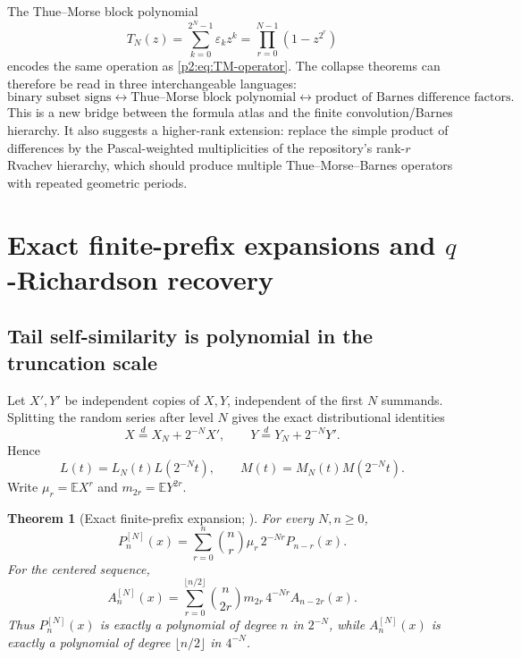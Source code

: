 \documentclass[11pt,oneside]{article}
\numberwithin{equation}{section}
\newtheorem{theorem}{Theorem}[section]
\theoremstyle{definition}
\theoremstyle{remark}
\newcommand{\eps}{\varepsilon}
\begin{document}
The Thue--Morse block polynomial
\begin{equation}
 T_N(z)=\sum_{k=0}^{2^N-1}\eps_kz^k
 =\prod_{r=0}^{N-1}(1-z^{2^r})
 \label{p2:eq:TN}
\end{equation}
encodes the same operation as \eqref{p2:eq:TM-operator}.  The collapse theorems can therefore be read
in three interchangeable languages:
\begin{equation}
 \text{binary subset signs}
 \longleftrightarrow
 \text{Thue--Morse block polynomial}
 \longleftrightarrow
 \text{product of Barnes difference factors}.
 \label{p2:eq:three-languages}
\end{equation}
This is a new bridge between the formula atlas and the finite convolution/Barnes hierarchy.  It also
suggests a higher-rank extension: replace the simple product of differences by the Pascal-weighted
multiplicities of the repository's rank-$r$ Rvachev hierarchy, which should produce multiple
Thue--Morse--Barnes operators with repeated geometric periods.

\section{Exact finite-prefix expansions and \texorpdfstring{$q$}{q}-Richardson recovery}
\label{p2:sec:richardson}

\subsection{Tail self-similarity is polynomial in the truncation scale}

Let $X',Y'$ be independent copies of $X,Y$, independent of the first $N$ summands.  Splitting the
random series after level $N$ gives the exact distributional identities
\begin{equation}
 X\overset{d}=X_N+2^{-N}X',
 \qquad
 Y\overset{d}=Y_N+2^{-N}Y'.
 \label{p2:eq:tail-self-similarity}
\end{equation}
Hence
\begin{equation}
 L(t)=L_N(t)L(2^{-N}t),
 \qquad
 M(t)=M_N(t)M(2^{-N}t).
 \label{p2:eq:finite-infinite-mgf}
\end{equation}
Write $\mu_r=\mathbb EX^r$ and $m_{2r}=\mathbb EY^{2r}$.

\begin{theorem}[Exact finite-prefix expansion; \statusnew]
\label{p2:thm:finite-prefix-expansion}
For every $N,n\ge0$,
\begin{equation}
 \boxed{
 P_n^{[N]}(x)
 =\sum_{r=0}^{n}\binom nr\mu_r\,2^{-Nr}P_{n-r}(x).
 }
 \label{p2:eq:P-prefix-expansion}
\end{equation}
For the centered sequence,
\begin{equation}
 \boxed{
 A_n^{[N]}(x)
 =\sum_{r=0}^{\lfloor n/2\rfloor}
 \binom n{2r}m_{2r}\,4^{-Nr}A_{n-2r}(x).
 }
 \label{p2:eq:A-prefix-expansion}
\end{equation}
Thus $P_n^{[N]}(x)$ is exactly a polynomial of degree $n$ in $2^{-N}$, while
$A_n^{[N]}(x)$ is exactly a polynomial of degree $\lfloor n/2\rfloor$ in $4^{-N}$.
\end{theorem}
\end{document}
